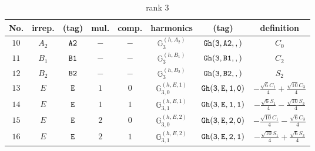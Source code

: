 \documentclass[fleqn,8pt]{jsarticle}
\begin{document}
\begin{table}[ht!]
\begin{center}
\caption{rank 3}
\renewcommand{\arraystretch}{1.3}
\begin{tabular}{cccccccc} \hline \hline
No. & irrep. & (tag) & mul. & comp. & harmonics & (tag) & definition \\ \hline
$ 10 $ & $ A_{2} $ & $ {\tt A2} $ & $ - $ & $ - $ & $ \mathbb{G}_{3}^{(h,A_{2})} $ & $ {\tt Gh(3,A2,,)} $ & $ C_{0} $ \\
$ 11 $ & $ B_{1} $ & $ {\tt B1} $ & $ - $ & $ - $ & $ \mathbb{G}_{3}^{(h,B_{1})} $ & $ {\tt Gh(3,B1,,)} $ & $ C_{2} $ \\
$ 12 $ & $ B_{2} $ & $ {\tt B2} $ & $ - $ & $ - $ & $ \mathbb{G}_{3}^{(h,B_{2})} $ & $ {\tt Gh(3,B2,,)} $ & $ S_{2} $ \\
$ 13 $ & $ E $ & $ {\tt E} $ & $ 1 $ & $ 0 $ & $ \mathbb{G}_{3,0}^{(h,E,1)} $ & $ {\tt Gh(3,E,1,0)} $ & $ - \frac{\sqrt{6} C_{1}}{4} + \frac{\sqrt{10} C_{3}}{4} $ \\
$ 14 $ & $ E $ & $ {\tt E} $ & $ 1 $ & $ 1 $ & $ \mathbb{G}_{3,1}^{(h,E,1)} $ & $ {\tt Gh(3,E,1,1)} $ & $ - \frac{\sqrt{6} S_{1}}{4} - \frac{\sqrt{10} S_{3}}{4} $ \\
$ 15 $ & $ E $ & $ {\tt E} $ & $ 2 $ & $ 0 $ & $ \mathbb{G}_{3,0}^{(h,E,2)} $ & $ {\tt Gh(3,E,2,0)} $ & $ - \frac{\sqrt{10} C_{1}}{4} - \frac{\sqrt{6} C_{3}}{4} $ \\
$ 16 $ & $ E $ & $ {\tt E} $ & $ 2 $ & $ 1 $ & $ \mathbb{G}_{3,1}^{(h,E,2)} $ & $ {\tt Gh(3,E,2,1)} $ & $ - \frac{\sqrt{10} S_{1}}{4} + \frac{\sqrt{6} S_{3}}{4} $ \\
 \hline \hline
\end{tabular}
\end{center}
\end{table}
\end{document}
